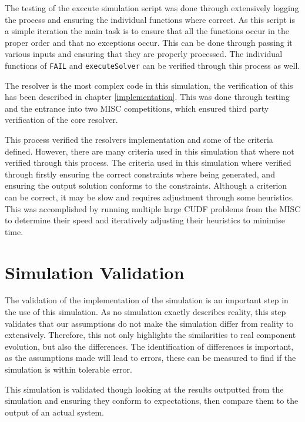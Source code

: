 The testing of the execute simulation script was done through extensively logging the process and ensuring the individual functions where correct.
As this script is a simple iteration the main task is to ensure that all the functions occur in the proper order and that no exceptions occur.
This can be done through passing it various inputs and ensuring that they are properly processed.
The individual functions of \verb+FAIL+ and \verb+executeSolver+ can be verified through this process as well.


The resolver is the most complex code in this simulation, the verification of this has been described in chapter \ref{implementation}.
This was done through testing and the entrance into two MISC competitions, which ensured third party verification of the core resolver.

This process verified the resolvers implementation and some of the criteria defined.
However, there are many criteria used in this simulation that where not verified through this process.
The criteria used in this simulation where verified through firstly ensuring the correct constraints where being generated, 
and ensuring the output solution conforms to the constraints.
Although a criterion can be correct, it may be slow and requires adjustment through some heuristics.
This was accomplished by running multiple large CUDF problems from the MISC to determine their speed and iteratively adjusting their heuristics to minimise time. 

\section{Simulation Validation}
The validation of the implementation of the simulation is an important step in the use of this simulation.
As no simulation exactly describes reality, this step validates that our assumptions do not make the simulation differ from reality to extensively.
Therefore, this not only highlights the similarities to real component evolution, but also the differences.
The identification of differences is important, as the assumptions made will lead to errors, these can be measured to find if the simulation is within tolerable error. 

This simulation is validated though looking at the results outputted from the simulation and ensuring they conform to expectations, 
then compare them to the output of an actual system.

